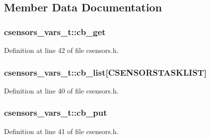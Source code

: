 \subsection{Member Data Documentation}
\subsubsection[{\texorpdfstring{cb\+\_\+get}{cb_get}}]{ csensors\+\_\+vars\+\_\+t\+::cb\+\_\+get}\hypertarget{structcsensors__vars__t_a2fc3b5c404a9668b5a5e3fb66ed01180}{}\label{structcsensors__vars__t_a2fc3b5c404a9668b5a5e3fb66ed01180}


Definition at line 42 of file csensors.\+h.

\subsubsection[{\texorpdfstring{cb\+\_\+list}{cb_list}}]{ csensors\+\_\+vars\+\_\+t\+::cb\+\_\+list\mbox{[}{\bf C\+S\+E\+N\+S\+O\+R\+S\+T\+A\+S\+K\+L\+I\+ST}\mbox{]}}\hypertarget{structcsensors__vars__t_a09f8c0d295debc6912e1a877078f3f10}{}\label{structcsensors__vars__t_a09f8c0d295debc6912e1a877078f3f10}


Definition at line 40 of file csensors.\+h.

\subsubsection[{\texorpdfstring{cb\+\_\+put}{cb_put}}]{ csensors\+\_\+vars\+\_\+t\+::cb\+\_\+put}\hypertarget{structcsensors__vars__t_a2e2bebec9c28a67d5b3a6e0d53d6a439}{}\label{structcsensors__vars__t_a2e2bebec9c28a67d5b3a6e0d53d6a439}


Definition at line 41 of file csensors.\+h.

